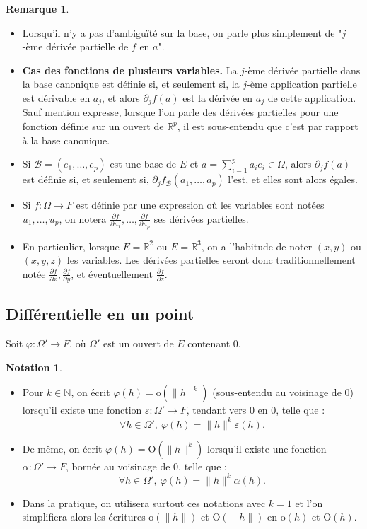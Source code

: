 \documentclass[french]{article}
\newcommand{\N}{\mathbb{N}}
\newcommand{\R}{\mathbb{R}}
\renewcommand{\o}{\text{o}}
\renewcommand{\O}{\text{O}}
\theoremstyle{plain}
\theoremstyle{definition}
\newtheorem*{rmq}{Remarque}
\newtheorem*{notation}{Notation}
\theoremstyle{remark}
\begin{document}
\begin{rmq}
	\begin{itemize}
		\item Lorsqu'il n'y a pas d'ambiguïté sur la base, on parle plus simplement de "$j$-ème dérivée partielle de $f$ en $a$".
		\item \textbf{Cas des fonctions de plusieurs variables.} La $j$-ème dérivée partielle dans la base canonique est définie si, et seulement si, la $j$-ème application partielle est dérivable en $a_j$, et alors $\partial_jf(a)$ est la dérivée en $a_j$ de cette application.\\
		Sauf mention expresse, lorsque l'on parle des dérivées partielles pour une fonction définie sur un ouvert de $\R^p$, il est sous-entendu que c'est par rapport à la base canonique.
		\item Si $\mathcal{B}=(e_1,\ldots,e_p)$ est une base de $E$ et $a=\displaystyle\sum_{i=1}^{p}a_ie_i\in\Omega$, alors $\partial_jf(a)$ est définie si, et seulement si, $\partial_jf_{\mathcal{B}}(a_1,\ldots,a_p)$ l'est, et elles sont alors égales.
		\item Si $f:\Omega\to F$ est définie par une expression où les variables sont notées $u_1,\ldots,u_p$, on notera $\displaystyle\frac{\partial f}{\partial u_1},\ldots,\frac{\partial f}{\partial u_p}$ ses dérivées partielles.
		\item En particulier, lorsque $E=\R^2$ ou $E=\R^3$, on a l'habitude de noter $(x,y)$ ou $(x,y,z)$ les variables. Les dérivées partielles seront donc traditionnellement notée $\displaystyle\frac{\partial f}{\partial x},\frac{\partial f}{\partial y}$, et éventuellement $\displaystyle\frac{\partial f}{\partial z}$.
	\end{itemize}
\end{rmq}

\subsection{Différentielle en un point}
Soit $\varphi:\Omega'\to F$, où $\Omega'$ est un ouvert de $E$ contenant $0$.

\begin{notation}
	\begin{itemize}
		\item Pour $k\in\N$, on écrit $\varphi(h)=\o(\lVert h\rVert^k)$ (sous-entendu au voisinage de $0$) lorsqu'il existe une fonction $\varepsilon:\Omega'\to F$, tendant vers $0$ en $0$, telle que : 
		$$\forall h\in\Omega',\ \varphi(h)=\lVert h\rVert^k\varepsilon(h).$$
		\item De même, on écrit $\varphi(h)=\O(\lVert h\rVert^k)$ lorsqu'il existe une fonction $\alpha:\Omega'\to F$, bornée au voisinage de $0$, telle que : 
		$$\forall h\in\Omega',\ \varphi(h)=\lVert h\rVert^k\alpha(h).$$
		\item Dans la pratique, on utilisera surtout ces notations avec $k=1$ et l'on simplifiera alors les écritures $\o(\lVert h\rVert)$ et $\O(\lVert h\rVert)$ en $\o(h)$ et $\O(h)$.
	\end{itemize}
\end{notation}
\end{document}

